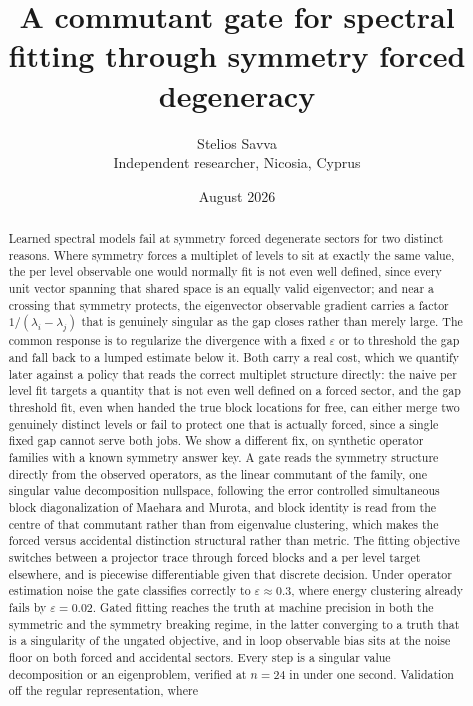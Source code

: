 \documentclass[11pt]{article}
\title{A commutant gate for spectral fitting through symmetry forced degeneracy}
\author{Stelios Savva\\ \small Independent researcher, Nicosia, Cyprus}
\date{August 2026}
\begin{document}
\maketitle

\begin{abstract}
Learned spectral models fail at symmetry forced degenerate sectors for two
distinct reasons. Where symmetry forces a multiplet of levels to sit at exactly
the same value, the per level observable one would normally fit is not even well
defined, since every unit vector spanning that shared space is an equally valid
eigenvector; and near a crossing that symmetry protects, the eigenvector
observable gradient carries a factor $1/(\lambda_i-\lambda_j)$ that is genuinely
singular as the gap closes rather than merely large. The common response is to
regularize the divergence with a fixed $\varepsilon$ or to threshold the gap and
fall back to a lumped estimate below it. Both carry a real cost, which we
quantify later against a policy that reads the correct multiplet structure
directly: the naive per level fit targets a quantity that is not even well
defined on a forced sector, and the gap threshold fit, even when handed the true
block locations for free, can either merge two genuinely distinct levels or fail
to protect one that is actually forced, since a single fixed gap cannot serve
both jobs. We show a different fix, on synthetic
operator families with a known symmetry answer key. A gate reads the symmetry
structure directly from the observed operators, as the linear commutant of the
family, one singular value decomposition nullspace, following the error
controlled simultaneous block diagonalization of Maehara and Murota, and block
identity is read from the centre of that commutant rather than from eigenvalue
clustering, which makes the forced versus accidental distinction structural
rather than metric. The fitting objective switches between a projector trace
through forced blocks and a per level target elsewhere, and is piecewise
differentiable given that discrete decision. Under operator estimation noise the
gate classifies correctly to $\varepsilon\approx0.3$, where energy clustering
already fails by $\varepsilon=0.02$. Gated fitting reaches the truth at machine
precision in both the symmetric and the symmetry breaking regime, in the latter
converging to a truth that is a singularity of the ungated objective, and in loop
observable bias sits at the noise floor on both forced and accidental sectors.
Every step is a singular value decomposition or an eigenproblem, verified at
$n=24$ in under one second. Validation off the regular representation, where

\end{abstract}
\end{document}
